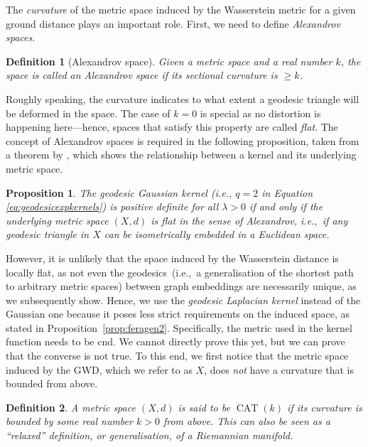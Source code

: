 \documentclass{article}
\DeclareMathOperator{\CAT}{CAT}
\newtheorem{definition}{Definition}
\newtheorem{proposition}{Proposition}
\begin{document}
The \emph{curvature} of the metric space induced by the Wasserstein metric for a given ground distance plays an important role. First, we need to define \emph{Alexandrov spaces}.
\begin{definition}[Alexandrov space]
    Given a metric space and a real number $k$, the space is called an Alexandrov space if its sectional curvature is $\geq k$.
\end{definition}
Roughly speaking, the curvature indicates to what extent a geodesic triangle will be deformed in the space. The case of $k = 0$ is special as no distortion is happening here---hence, spaces that satisfy this property are called \emph{flat}. The concept of Alexandrov spaces is required in the following proposition, taken from a theorem by \citet{feragen2015geodesic}, which shows the relationship between a kernel and its underlying metric space.
\begin{proposition}
\label{prop:feragen}
The geodesic Gaussian kernel (i.e., $q=2$ in Equation \ref{eq:geodesicexpkernels}) is positive definite for all $\lambda > 0$ if and only if the underlying metric space $(X, d)$ is flat in the sense of Alexandrov, i.e.,\ if any geodesic triangle in $X$ can be isometrically embedded in a Euclidean space.
\end{proposition}
However, it is unlikely that the space induced by the Wasserstein distance is locally flat, as not even the geodesics~(i.e.,\ a generalisation of the shortest path to arbitrary metric spaces) between graph embeddings are necessarily unique, as we subsequently show. Hence,
we use the \emph{geodesic Laplacian kernel} instead of the Gaussian one because it poses less strict requirements on the induced space, as stated in Proposition~\ref{prop:feragen2}. Specifically, the metric used in the kernel function needs to be cnd. We cannot directly prove this yet, but we can prove that the converse is not true. To this end, we first notice that the metric space induced by the GWD, which we refer to as $X$, does \emph{not} have a curvature that is bounded from above.

\begin{definition}
A metric space $(X,d)$ is said to be $\CAT(k)$ if its curvature is bounded by some real number $k>0$ from above. This can also be seen as a ``relaxed'' definition, or generalisation, of a Riemannian manifold.
\end{definition}
\end{document}
